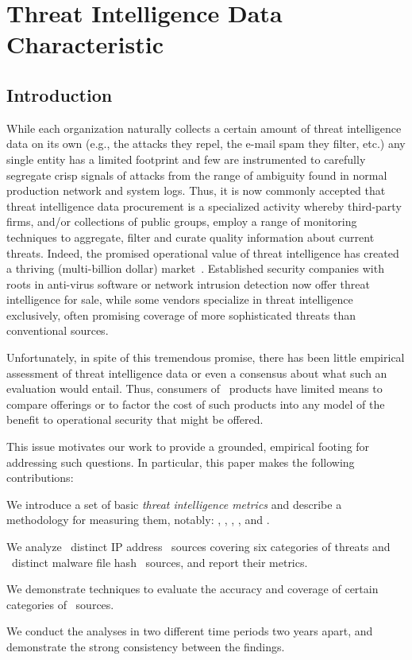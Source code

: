 \chapter{Threat Intelligence Data Characteristic}
\label{chapter:data_character}

\section{Introduction}

While each organization naturally collects a certain amount of threat
intelligence data on its own (e.g., the attacks they repel, the e-mail
spam they filter, etc.) any single entity has a limited footprint and
few are instrumented to carefully segregate crisp signals of attacks
from the range of ambiguity found in normal production network and
system logs.  Thus, it is now commonly accepted that threat
intelligence data procurement is a specialized activity whereby
third-party firms, and/or collections of public groups, employ a range
of monitoring techniques to aggregate, filter and curate quality
information about current threats.  Indeed, the promised operational
value of threat intelligence has created a thriving (multi-billion
dollar) market~\cite{timarket}. Established security companies with
roots in anti-virus software or network intrusion detection now offer
threat intelligence for sale, while some vendors specialize in threat
intelligence exclusively, often promising coverage of more
sophisticated threats than conventional sources.

Unfortunately, in spite of this tremendous promise, there has been
little empirical assessment of threat intelligence data or even a
consensus about what such an evaluation would entail.  Thus, consumers
of \ti\ products have limited means to compare offerings
or to factor the cost of such products into any model of the benefit
to operational security that might be offered.

This issue motivates our work to provide a grounded,
empirical footing for addressing such questions.  In particular, this
paper makes the following contributions:
\begin{prettylist}
\item We introduce a set of basic \emph{threat intelligence metrics}
and describe a methodology for measuring them, notably: ,
, ,
,  and .
\item We analyze \numipfeeds\ distinct IP address \ti\ sources covering
six categories of threats and \numhashfeeds\ distinct malware file hash
\ti\ sources, and report their metrics.
\item We demonstrate techniques to evaluate the accuracy and coverage of
certain categories of \ti\ sources.
\item We conduct the analyses in two different time periods two years apart,
and demonstrate the strong consistency between the findings.
\end{prettylist}

